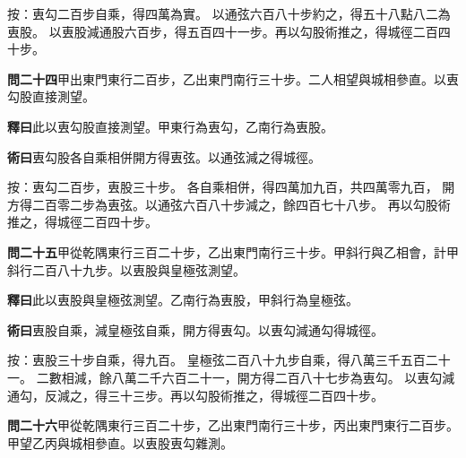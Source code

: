\documentclass[12pt,a4paper]{article}
\begin{document}
\vspace{0.3em}

\noindent
按：叀勾二百步自乘，得四萬為實。
以通弦六百八十步約之，得五十八點八二為叀股。
以叀股減通股六百步，得五百四十一步。再以勾股術推之，得城徑二百四十步。

\vspace{0.5em}

\noindent\textbf{問二十四}\quad 甲出東門東行二百步，乙出東門南行三十步。二人相望與城相參直。以叀勾股直接測望。

\vspace{0.3em}

\noindent\textbf{釋曰}\quad 此以叀勾股直接測望。甲東行為叀勾，乙南行為叀股。

\vspace{0.3em}

\noindent\textbf{術曰}\quad 叀勾股各自乘相併開方得叀弦。以通弦減之得城徑。

\vspace{0.3em}

\noindent
按：叀勾二百步，叀股三十步。
各自乘相併，得四萬加九百，共四萬零九百，
開方得二百零二步為叀弦。以通弦六百八十步減之，餘四百七十八步。
再以勾股術推之，得城徑二百四十步。

\vspace{0.5em}

\noindent\textbf{問二十五}\quad 甲從乾隅東行三百二十步，乙出東門南行三十步。甲斜行與乙相會，計甲斜行二百八十九步。以叀股與皇極弦測望。

\vspace{0.3em}

\noindent\textbf{釋曰}\quad 此以叀股與皇極弦測望。乙南行為叀股，甲斜行為皇極弦。

\vspace{0.3em}

\noindent\textbf{術曰}\quad 叀股自乘，減皇極弦自乘，開方得叀勾。以叀勾減通勾得城徑。

\vspace{0.3em}

\noindent
按：叀股三十步自乘，得九百。
皇極弦二百八十九步自乘，得八萬三千五百二十一。
二數相減，餘八萬二千六百二十一，開方得二百八十七步為叀勾。
以叀勾減通勾，反減之，得三十三步。再以勾股術推之，得城徑二百四十步。

\vspace{0.5em}

\noindent\textbf{問二十六}\quad 甲從乾隅東行三百二十步，乙出東門南行三十步，丙出東門東行二百步。甲望乙丙與城相參直。以叀股叀勾雜測。
\end{document}
